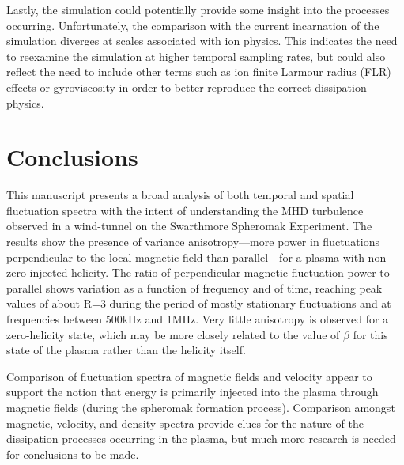 \documentclass[preprint2]{aastex}
\begin{document}
Lastly, the simulation could potentially provide some insight into the processes occurring. Unfortunately, the comparison with the current incarnation of the simulation diverges at scales associated with ion physics. This indicates the need to reexamine the simulation at higher temporal sampling rates, but could also reflect the need to include other terms such as ion finite Larmour radius (FLR) effects or gyroviscosity in order to better reproduce the correct dissipation physics.


\section{Conclusions}\label{sec:conclusions}

This manuscript presents a broad analysis of both temporal and spatial fluctuation spectra with the intent of understanding the MHD turbulence observed in a wind-tunnel on the Swarthmore Spheromak Experiment. The results show the presence of variance anisotropy---more power in fluctuations perpendicular to the local magnetic field than parallel---for a plasma with non-zero injected helicity. The ratio of perpendicular magnetic fluctuation power to parallel shows variation as a function of frequency and of time, reaching peak values of about R=3 during the period of mostly stationary fluctuations and at frequencies between 500kHz and 1MHz. Very little anisotropy is observed for a zero-helicity state, which may be more closely related to the value of $\beta$ for this state of the plasma rather than the helicity itself.

Comparison of fluctuation spectra of magnetic fields and velocity appear to support the notion that energy is primarily injected into the plasma through magnetic fields (during the spheromak formation process). Comparison amongst magnetic, velocity, and density spectra provide clues for the nature of the dissipation processes occurring in the plasma, but much more research is needed for conclusions to be made.
\end{document}
